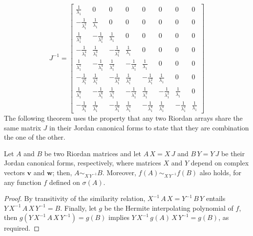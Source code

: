 \begin{displaymath}
J^{-1} = \left[\begin{matrix}\frac{1}{\lambda_{1}} & 0 & 0 & 0 & 0 & 0 & 0 & 0\\- \frac{1}{\lambda_{1}^{2}} & \frac{1}{\lambda_{1}} & 0 & 0 & 0 & 0 & 0 & 0\\\frac{1}{\lambda_{1}^{3}} & - \frac{1}{\lambda_{1}^{2}} & \frac{1}{\lambda_{1}} & 0 & 0 & 0 & 0 & 0\\- \frac{1}{\lambda_{1}^{4}} & \frac{1}{\lambda_{1}^{3}} & - \frac{1}{\lambda_{1}^{2}} & \frac{1}{\lambda_{1}} & 0 & 0 & 0 & 0\\\frac{1}{\lambda_{1}^{5}} & - \frac{1}{\lambda_{1}^{4}} & \frac{1}{\lambda_{1}^{3}} & - \frac{1}{\lambda_{1}^{2}} & \frac{1}{\lambda_{1}} & 0 & 0 & 0\\- \frac{1}{\lambda_{1}^{6}} & \frac{1}{\lambda_{1}^{5}} & - \frac{1}{\lambda_{1}^{4}} & \frac{1}{\lambda_{1}^{3}} & - \frac{1}{\lambda_{1}^{2}} & \frac{1}{\lambda_{1}} & 0 & 0\\\frac{1}{\lambda_{1}^{7}} & - \frac{1}{\lambda_{1}^{6}} & \frac{1}{\lambda_{1}^{5}} & - \frac{1}{\lambda_{1}^{4}} & \frac{1}{\lambda_{1}^{3}} & - \frac{1}{\lambda_{1}^{2}} & \frac{1}{\lambda_{1}} & 0\\- \frac{1}{\lambda_{1}^{8}} & \frac{1}{\lambda_{1}^{7}} & - \frac{1}{\lambda_{1}^{6}} & \frac{1}{\lambda_{1}^{5}} & - \frac{1}{\lambda_{1}^{4}} & \frac{1}{\lambda_{1}^{3}} & - \frac{1}{\lambda_{1}^{2}} & \frac{1}{\lambda_{1}}\end{matrix}\right]
\end{displaymath}
\fi
The following theorem uses the property that any two Riordan arrays
share the same matrix $J$ in their Jordan canonical forms to state that they
are combination the one of the other.
\begin{theorem}
Let $A$ and $B$ be two Riordan matrices and let $A\,X = X\,J$ and $B\,Y= Y\,J$
be their Jordan canonical forms, respectively, where matrices $X$ and $Y$ depend
on complex vectors $\boldsymbol{v}$ and $\boldsymbol{w}$; then, $A
\sim_{X\,Y^{-1}} B$. Moreover, $f(A) \sim_{X\,Y^{-1}} f(B)$ also holds, for any
function $f$ defined on $\sigma(A)$.
\end{theorem}
\begin{proof}
By transitivity of the similarity relation, $X^{-1}\,A\,X = Y^{-1}\,B\,Y$
entails $Y\,X^{-1}\,A\,X\,Y^{-1} = B$. Finally, let $g$ be the Hermite
interpolating polynomial of $f$, then $g(Y\,X^{-1}\,A\,X\,Y^{-1}) = g(B)$
implies $Y\,X^{-1}\,g(A)\,X\,Y^{-1} = g(B)$, as required.
\end{proof}

